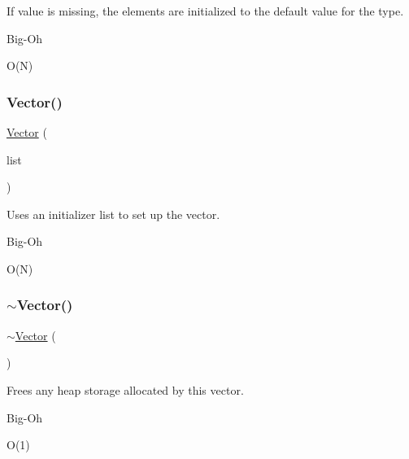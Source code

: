 If {\ttfamily value} is missing, the elements are initialized to the default value for the type. \begin{DoxyRefDesc}{Big-\/\+Oh}
\item[\mbox{\hyperlink{BigOh__BigOh000100}{Big-\/\+Oh}}]O(\+N) \end{DoxyRefDesc}
\mbox{\label{classVector_a81ccc7dac38b6bdeca04281b1acb39c0}} 
\subsubsection{\texorpdfstring{Vector()}{Vector()}\hspace{0.1cm}{\footnotesize\ttfamily [3/3]}}
{\footnotesize\ttfamily \mbox{\hyperlink{classVector}{Vector}} (\begin{DoxyParamCaption}\item[{std\+::initializer\+\_\+list$<$ Value\+Type $>$}]{list }\end{DoxyParamCaption})}



Uses an initializer list to set up the vector. 

\begin{DoxyRefDesc}{Big-\/\+Oh}
\item[\mbox{\hyperlink{BigOh__BigOh000101}{Big-\/\+Oh}}]O(\+N) \end{DoxyRefDesc}
\mbox{\label{classVector_aaa9fccd0cb7734271f7a15e5d9dc0d27}} 
\subsubsection{\texorpdfstring{$\sim$\+Vector()}{~Vector()}}
{\footnotesize\ttfamily $\sim$\mbox{\hyperlink{classVector}{Vector}} (\begin{DoxyParamCaption}{ }\end{DoxyParamCaption})\hspace{0.3cm}{\ttfamily [virtual]}}



Frees any heap storage allocated by this vector. 

\begin{DoxyRefDesc}{Big-\/\+Oh}
\item[\mbox{\hyperlink{BigOh__BigOh000102}{Big-\/\+Oh}}]O(1) \end{DoxyRefDesc}


